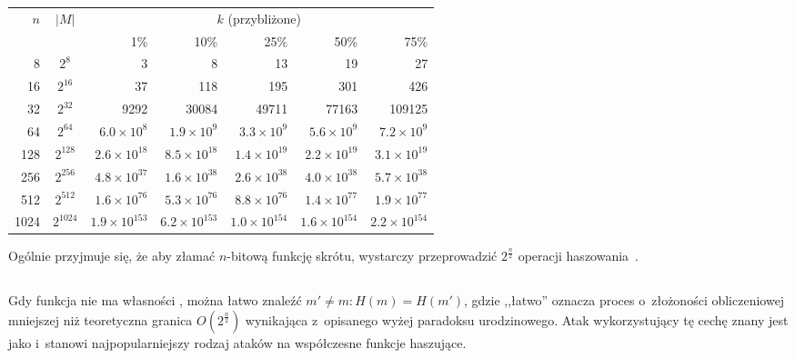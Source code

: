 \begin{tabular}{|r|c|*{5}{r|}}
\hline
\multirow{2}{*}{$n$} & \multirow{2}{*}{$|M|$} & \multicolumn{5}{c|}{$k$ (przybliżone)} \\
\cline{3-7}
& & 1\% & 10\% & 25\% & 50\% & 75\% \\
\hline
   8 &    $2^{8}$ & 3                     & 8                     & 13                    & 19                    & 27 \\
  16 &   $2^{16}$ & 37                    & 118                   & 195                   & 301                   & 426 \\
  32 &   $2^{32}$ & 9292                  & 30084                 & 49711                 & 77163                 & 109125 \\
  64 &   $2^{64}$ & $6.0 \times 10^{8}$   & $1.9 \times 10^{9}$   & $3.3 \times 10^{9}$   & $5.6 \times 10^{9}$   & $7.2 \times 10^{9}$ \\
 128 &  $2^{128}$ & $2.6 \times 10^{18}$  & $8.5 \times 10^{18}$  & $1.4 \times 10^{19}$  & $2.2 \times 10^{19}$  & $3.1 \times 10^{19}$ \\
 256 &  $2^{256}$ & $4.8 \times 10^{37}$  & $1.6 \times 10^{38}$  & $2.6 \times 10^{38}$  & $4.0 \times 10^{38}$  & $5.7 \times 10^{38}$ \\
 512 &  $2^{512}$ & $1.6 \times 10^{76}$  & $5.3 \times 10^{76}$  & $8.8 \times 10^{76}$  & $1.4 \times 10^{77}$  & $1.9 \times 10^{77}$ \\
1024 & $2^{1024}$ & $1.9 \times 10^{153}$ & $6.2 \times 10^{153}$ & $1.0 \times 10^{154}$ & $1.6 \times 10^{154}$ & $2.2 \times 10^{154}$ \\
\hline
\end{tabular}

\pagebreak
Ogólnie przyjmuje się, że aby złamać $n$-bitową funkcję skrótu, wystarczy
przeprowadzić $2^\frac{n}{2}$ operacji haszowania~\cite{birthday3}.



\subsection{}
Gdy funkcja nie ma własności , można łatwo znaleźć $m'
\neq m : H(m) = H(m')$, gdzie ,,łatwo'' oznacza proces o~złożoności
obliczeniowej mniejszej niż teoretyczna granica $O(2^\frac{n}{2})$
wynikająca z~opisanego wyżej paradoksu urodzinowego. Atak wykorzystujący tę
cechę znany jest jako  i~stanowi najpopularniejszy
rodzaj ataków na współczesne funkcje haszujące.

